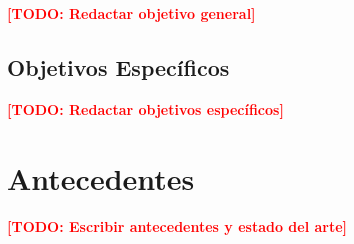 \documentclass[12pt, letterpaper, oneside]{article}
\newcommand{\TODO}[1]{\textcolor{red}{\textbf{[TODO: #1]}}}
\begin{document}
\TODO{Redactar objetivo general}


\subsection{Objetivos Específicos}
\label{subsec:objetivos-especificos}


\TODO{Redactar objetivos específicos}


\section{Antecedentes}
\label{sec:antecedentes}


\TODO{Escribir antecedentes y estado del arte}


\end{document}
